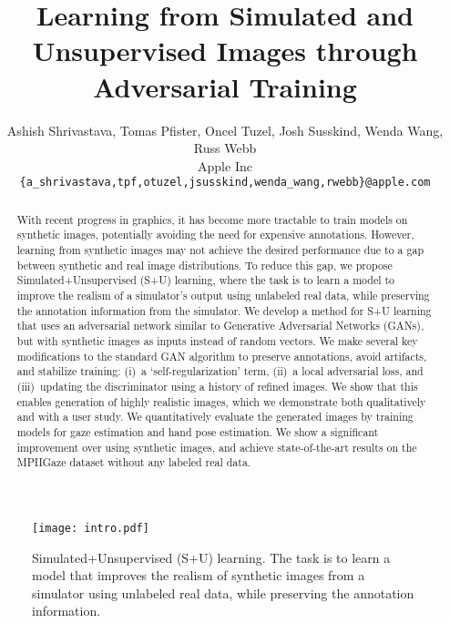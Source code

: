 \documentclass[10pt,twocolumn,letterpaper]{article}
\begin{document}
\title{Learning from Simulated and Unsupervised Images through Adversarial Training }

\author{Ashish Shrivastava, Tomas Pfister, Oncel Tuzel, Josh Susskind, Wenda Wang, Russ Webb \\ 
Apple Inc\\
{\tt\small \{a\_shrivastava,tpf,otuzel,jsusskind,wenda\_wang,rwebb\}@apple.com}
}


\maketitle




\thispagestyle{fancy}
\begin{abstract}
With recent progress in graphics, it has become more tractable to train models on synthetic images, potentially avoiding the need for expensive annotations. 
However, learning from synthetic images may not achieve the desired performance due to a gap between synthetic and real image distributions. 
To reduce this gap, we propose Simulated+Unsupervised (S+U) learning, where the task is to learn a model to improve the realism of a simulator's output using unlabeled real data, while preserving the annotation information from the simulator.
We develop a method for S+U learning that uses an adversarial network similar to Generative Adversarial Networks (GANs), but with synthetic images as inputs instead of random vectors. 
We make several key modifications to the standard GAN algorithm to preserve annotations, avoid artifacts, and stabilize training: (i)~a `self-regularization' term, (ii)~a local adversarial loss, and (iii)~updating the discriminator using a history of refined images. 
We show that this enables generation of highly realistic images, which we demonstrate both qualitatively and with a user study.
We quantitatively evaluate the generated images by training models for gaze estimation and hand pose estimation.
We show a significant improvement over using synthetic images, and achieve state-of-the-art results on the MPIIGaze dataset without any labeled real data.
\end{abstract}



\begin{figure}
\centering
\texttt{[image: intro.pdf]}
\caption{Simulated+Unsupervised (S+U) learning. The task is to learn a model that improves the realism of synthetic images from a simulator using unlabeled real data, while preserving the annotation information.}
\label{fig:intro}
\end{figure}
\end{document}
